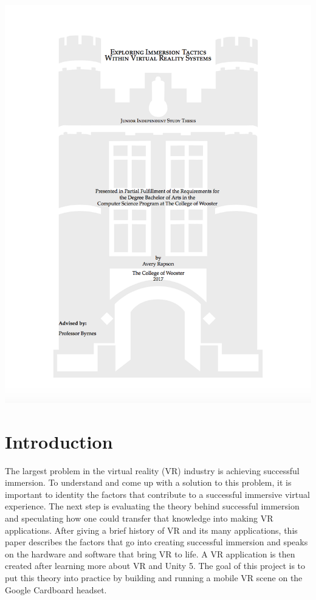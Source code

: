 \documentclass[12pt]{article}
\begin{document}
\includegraphics[width=\textwidth]{cover}

\clearpage
\setcounter{page}{1}


\tableofcontents


\newpage



\section{Introduction}
The largest problem in the virtual reality (VR) industry is achieving successful immersion. To understand and come up with a solution to this problem, it is important to identity the factors that contribute to a successful immersive virtual experience. The next step is evaluating the theory behind successful immersion and speculating how one could transfer that knowledge into making VR applications.  After giving a brief history of VR and its many applications, this paper describes the factors that go into creating successful immersion and speaks on the hardware and software that bring VR to life.
A VR application is then created after learning more about VR and Unity 5. The goal of this project is to put this theory into practice by building and running a mobile VR scene on the Google Cardboard headset. 
\end{document}
